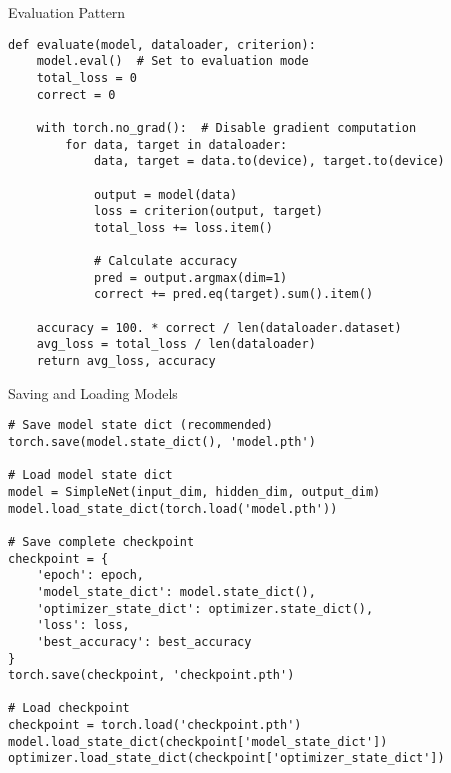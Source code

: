 \documentclass[aspectratio=169,10pt]{beamer}
\begin{document}
\begin{frame}[fragile]{Evaluation Pattern}
\begin{lstlisting}
def evaluate(model, dataloader, criterion):
    model.eval()  # Set to evaluation mode
    total_loss = 0
    correct = 0
    
    with torch.no_grad():  # Disable gradient computation
        for data, target in dataloader:
            data, target = data.to(device), target.to(device)
            
            output = model(data)
            loss = criterion(output, target)
            total_loss += loss.item()
            
            # Calculate accuracy
            pred = output.argmax(dim=1)
            correct += pred.eq(target).sum().item()
    
    accuracy = 100. * correct / len(dataloader.dataset)
    avg_loss = total_loss / len(dataloader)
    return avg_loss, accuracy
\end{lstlisting}
\end{frame}

\begin{frame}[fragile]{Saving and Loading Models}
\begin{lstlisting}
# Save model state dict (recommended)
torch.save(model.state_dict(), 'model.pth')

# Load model state dict
model = SimpleNet(input_dim, hidden_dim, output_dim)
model.load_state_dict(torch.load('model.pth'))

# Save complete checkpoint
checkpoint = {
    'epoch': epoch,
    'model_state_dict': model.state_dict(),
    'optimizer_state_dict': optimizer.state_dict(),
    'loss': loss,
    'best_accuracy': best_accuracy
}
torch.save(checkpoint, 'checkpoint.pth')

# Load checkpoint
checkpoint = torch.load('checkpoint.pth')
model.load_state_dict(checkpoint['model_state_dict'])
optimizer.load_state_dict(checkpoint['optimizer_state_dict'])
\end{lstlisting}
\end{frame}
\end{document}
